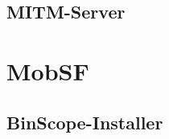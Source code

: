 \subsection{MITM-Server}\label{ap:mitmserver}
\lstset{language=Python}


\section{MobSF}
%

\subsection{BinScope-Installer}\label{ap:BinScopeInstaller}
\lstset{language=Python}


%

%


%
%

%
%

